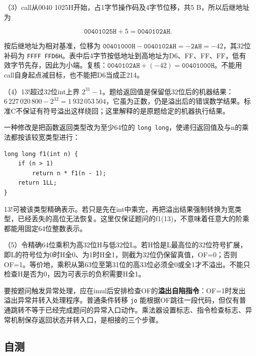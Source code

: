 （3）call从0040 1025H开始，占1字节操作码及4字节位移，共5 B，所以后继地址为

\[
\mathtt{00401025H}+5=\mathtt{0040102AH}.
\]

按后继地址为相对基准，位移为 \(\mathtt{00401000H}-\mathtt{0040102AH}=-\mathtt{2AH}=-42\)，其32位补码为 \allowbreak{}\texttt{FFFF\ FFD6H}。表中后4字节按低地址到高地址为D6、FF、FF、FF，低有效字节先存，因此为小端。复核：\(\mathtt{0040102AH}+(-42)=\mathtt{00401000H}\)。不能用call自身起点减目标，也不能把D6当成正214。

（4）13!超过32位int上界 \(2^{31}-1\)。题给返回值是保留低32位后的机器结果：\(6\,227\,020\,800-2^{32}=1\,932\,053\,504\)，它虽为正数，仍是溢出后的错误数学结果。标准C不保证有符号溢出这样绕回；这里解释的是原题给定的机器执行结果。

一种修改是把函数返回类型改为至少64位的 \allowbreak{}\texttt{long\ long}，使递归返回值及与n的乘法都按该较宽类型进行：

\par\medskip\noindent
\begin{minipage}{\linewidth}
\begin{verbatim}
long long f1(int n) {
    if (n > 1)
        return n * f1(n - 1);
    return 1LL;
}
\end{verbatim}
\end{minipage}\par\medskip

13!可被该类型精确表示。若只是先在int中乘完，再把溢出结果强制转换为宽类型，已经丢失的高位无法恢复。这里仅保证题问的f1(13)，不意味着任意大的阶乘都能用固定64位整数表示。

（5）令精确64位乘积为高32位H与低32位L。若H恰是L最高位的32位符号扩展，即L的符号位为0时H全0、为1时H全1，则截为32位仍保留真值，OF=0；否则OF=1。等价地，乘积从第63位至第31位的高33位必须全0或全1才不溢出。不能只检查H是否为0，因为可表示的负积需要H全1。

要按题问触发异常处理，应在imul后安排检查OF的\textbf{溢出自陷指令}：OF=1时发出溢出异常并转入处理程序。普通条件转移 \allowbreak{}\texttt{jo} 能根据OF跳往一段代码，但仅有普通跳转不等于已经完成题问的异常入口动作。乘法器设置标志、指令检查标志、异常机制保存返回状态并转入口，是相接的三个步骤。

\subsection{自测}\label{co-self4}

